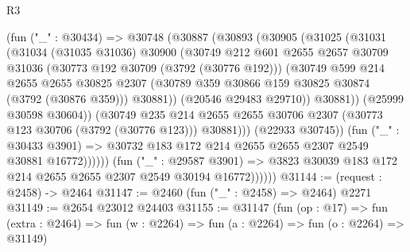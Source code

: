\begin{lexlean}{R3}
\begin{coremodule}
                        (fun ("_" : @30434) =>
                        @30748
                          (@30887
                            (@30893
                              (@30905
                                (@31025
                                  (@31031
                                    (@31034
                                      (@31035 @31036)
                                      @30900
                                      (@30749
                                        @212
                                        @601
                                        @2655
                                        @2657
                                        @30709
                                        @31036
                                        (@30773 @192 @30709 (@3792 (@30776 @192)))
                                        (@30749
                                          @599
                                          @214
                                          @2655
                                          @2655
                                          @30825
                                          @2307
                                          (@30789
                                            @359
                                            @30866
                                            @159
                                            @30825
                                            @30874
                                            (@3792 (@30876 @359)))
                                          @30881))
                                      (@20546 @29483 @29710))
                                    @30881))
                                (@25999 @30598 @30604))
                              (@30749
                                @235
                                @214
                                @2655
                                @2655
                                @30706
                                @2307
                                (@30773 @123 @30706 (@3792 (@30776 @123)))
                                @30881)))
                          (@22933 @30745))
                        (fun ("_" : @30433 @3901) =>
                        @30732 @183 @172 @214 @2655 @2655 @2307 @2549 @30881 @16772))))))
              (fun ("_" : @29587 @3901) =>
              @3823 @30039 @183 @172 @214 @2655 @2655 @2307 @2549 @30194 @16772))))))
@31144 := (request : @2458) -> @2464
@31147 := @2460 (fun ("_" : @2458) => @2464) @2271
@31149 := @2654 @23012 @24403
@31155 := @31147
    (fun (op : @17) =>
    fun (extra : @2464) => fun (w : @2264) => fun (a : @2264) => fun (o : @2264) => @31149)

\end{coremodule}
\end{lexlean}
